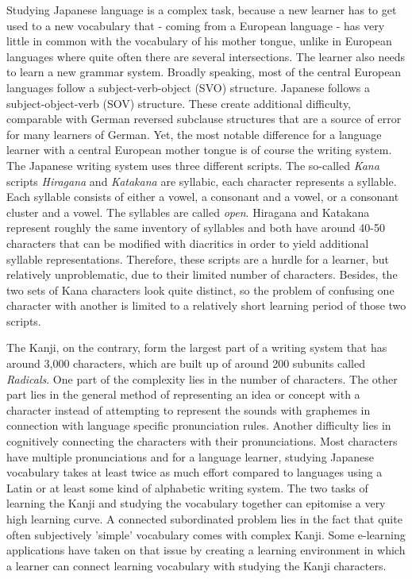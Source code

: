 Studying Japanese language is a complex task, because a new learner has to get 
used to a new vocabulary that - coming from a European language - has very 
little in common with the vocabulary of his mother tongue, unlike in European 
languages where quite often there are several intersections. The learner also 
needs to learn a new grammar system. Broadly speaking, most of the central 
European languages follow a subject-verb-object (SVO) structure. 
Japanese follows a subject-object-verb (SOV) structure. These create additional 
difficulty, comparable with German reversed subclause structures that 
are a source of error for many learners of German. 
Yet, the most notable difference for a language learner with a central European 
mother tongue is of course the writing system. The Japanese writing system uses 
three different scripts. The so-called \emph{Kana} scripts \emph{Hiragana} and 
\emph{Katakana} are syllabic, each character represents a syllable. Each syllable
consists of either a vowel, a consonant and a vowel, or a consonant cluster and 
a vowel. The syllables are called \emph{open}. Hiragana and Katakana represent 
roughly the same inventory of syllables and both have around 40-50 characters 
that can be modified with diacritics in order to yield additional syllable 
representations. Therefore, these scripts are a hurdle for a learner, but 
relatively unproblematic, due to their limited number of characters. 
Besides, the two sets of Kana characters look quite distinct, 
so the problem of confusing one character with another is limited to a relatively
short learning period of those two scripts.

The Kanji, on the contrary, form the largest part of a writing system that has 
around 3,000 characters, which are built up of around 200 subunits called 
\emph{Radicals}. 
One part of the complexity lies in the number of characters. 
The other part lies in the general method of representing an 
idea or concept with a character instead of attempting to represent the sounds
with graphemes in connection with language specific pronunciation rules. 
Another difficulty lies in cognitively connecting the characters with their 
pronunciations. Most characters have multiple pronunciations and for a language 
learner, studying Japanese vocabulary takes at least twice as much effort 
compared to languages using a Latin or at least some kind of alphabetic writing 
system. The two tasks of learning the Kanji and studying the vocabulary 
together can epitomise a very high learning curve. A connected subordinated 
problem lies in the fact that quite often subjectively 'simple' vocabulary comes 
with complex Kanji. Some e-learning applications have taken on that issue by 
creating a learning environment in which a learner can connect learning 
vocabulary with studying the Kanji characters.

